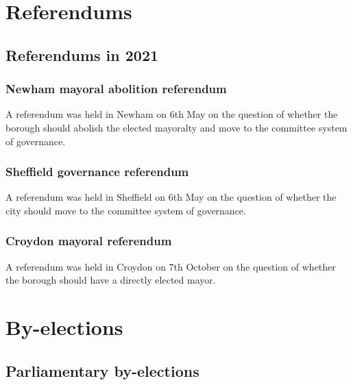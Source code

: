 \documentclass[a4paper,openany]{book}
\begin{document}



\part{Referendums}

\chapter{Referendums in 2021}


\section{Newham mayoral abolition referendum}

A referendum was held in Newham on 6th May on the question of whether the borough should abolish the elected mayoralty and move to the committee system of governance.

\section{Sheffield governance referendum}

A referendum was held in Sheffield on 6th May on the question of whether the city should move to the committee system of governance.

\section{Croydon mayoral referendum}

A referendum was held in Croydon on 7th October on the question of whether the borough should have a directly elected mayor.


\part{By-elections}

\chapter{Parliamentary by-elections}
\end{document}

